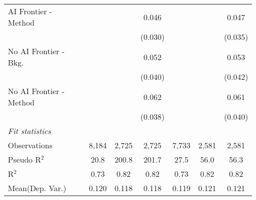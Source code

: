 \begin{tabular}{lcccccc}
   AI Frontier - Method    &              &               & 0.046         &              &              & 0.047\\   
                           &              &               & (0.030)       &              &              & (0.035)\\   
   No AI Frontier - Bkg.   &              &               & 0.052         &              &              & 0.053\\   
                           &              &               & (0.040)       &              &              & (0.042)\\   
   No AI Frontier - Method &              &               & 0.062         &              &              & 0.061\\   
                           &              &               & (0.038)       &              &              & (0.040)\\   
   \midrule
   \emph{Fit statistics}\\
   Observations            & 8,184        & 2,725         & 2,725         & 7,733        & 2,581        & 2,581\\  
   Pseudo R$^2$            & 20.8         & 200.8         & 201.7         & 27.5         & 56.0         & 56.3\\  
   R$^2$                   & 0.73         & 0.82          & 0.82          & 0.73         & 0.82         & 0.82\\  
Mean(Dep. Var.) & 0.120 & 0.118 & 0.118 & 0.119 & 0.121 & 0.121 \\
   

\end{tabular}
